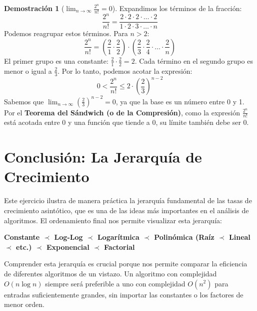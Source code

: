 \documentclass[12pt, a4paper]{article}
\theoremstyle{definition}
\newtheorem{demo}{Demostración}
\begin{document}
\begin{demo}[$\lim_{n \to \infty} \frac{2^n}{n!} = 0$]
Expandimos los términos de la fracción:
\[ \frac{2^n}{n!} = \frac{2 \cdot 2 \cdot 2 \cdot \dots \cdot 2}{1 \cdot 2 \cdot 3 \cdot \dots \cdot n} \]
Podemos reagrupar estos términos. Para $n > 2$:
\[ \frac{2^n}{n!} = \left(\frac{2}{1} \cdot \frac{2}{2}\right) \cdot \left(\frac{2}{3} \cdot \frac{2}{4} \cdot \dots \cdot \frac{2}{n}\right) \]
El primer grupo es una constante: $\frac{2}{1} \cdot \frac{2}{2} = 2$. Cada término en el segundo grupo es menor o igual a $\frac{2}{3}$. Por lo tanto, podemos acotar la expresión:
\[ 0 < \frac{2^n}{n!} \le 2 \cdot \left(\frac{2}{3}\right)^{n-2} \]
Sabemos que $\lim_{n \to \infty} \left(\frac{2}{3}\right)^{n-2} = 0$, ya que la base es un número entre 0 y 1.
Por el \textbf{Teorema del Sándwich (o de la Compresión)}, como la expresión $\frac{2^n}{n!}$ está acotada entre 0 y una función que tiende a 0, su límite también debe ser 0.
\end{demo}

\hrulefill
\section{Conclusión: La Jerarquía de Crecimiento}

Este ejercicio ilustra de manera práctica la jerarquía fundamental de las tasas de crecimiento asintótico, que es una de las ideas más importantes en el análisis de algoritmos. El ordenamiento final nos permite visualizar esta jerarquía:

\begin{center}
\Large
\textbf{Constante $\prec$ Log-Log $\prec$ Logarítmica $\prec$ Polinómica (Raíz $\prec$ Lineal $\prec$ etc.) $\prec$ Exponencial $\prec$ Factorial}
\end{center}

Comprender esta jerarquía es crucial porque nos permite comparar la eficiencia de diferentes algoritmos de un vistazo. Un algoritmo con complejidad $O(n \log n)$ siempre será preferible a uno con complejidad $O(n^2)$ para entradas suficientemente grandes, sin importar las constantes o los factores de menor orden.
\end{document}
